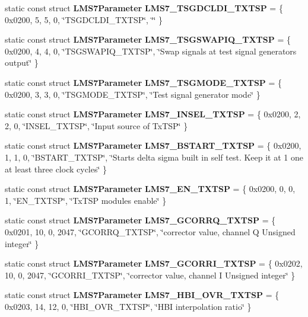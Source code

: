 \begin{DoxyCompactItemize}
\item 
static const struct {\bf L\+M\+S7\+Parameter} {\bf L\+M\+S7\+\_\+\+T\+S\+G\+D\+C\+L\+D\+I\+\_\+\+T\+X\+T\+SP} = \{ 0x0200, 5, 5, 0, \char`\"{}\+T\+S\+G\+D\+C\+L\+D\+I\+\_\+\+T\+X\+T\+S\+P\char`\"{}, \char`\"{}\char`\"{} \}
\item 
static const struct {\bf L\+M\+S7\+Parameter} {\bf L\+M\+S7\+\_\+\+T\+S\+G\+S\+W\+A\+P\+I\+Q\+\_\+\+T\+X\+T\+SP} = \{ 0x0200, 4, 4, 0, \char`\"{}\+T\+S\+G\+S\+W\+A\+P\+I\+Q\+\_\+\+T\+X\+T\+S\+P\char`\"{}, \char`\"{}\+Swap signals at test signal generator\textquotesingle{}s output\char`\"{} \}
\item 
static const struct {\bf L\+M\+S7\+Parameter} {\bf L\+M\+S7\+\_\+\+T\+S\+G\+M\+O\+D\+E\+\_\+\+T\+X\+T\+SP} = \{ 0x0200, 3, 3, 0, \char`\"{}\+T\+S\+G\+M\+O\+D\+E\+\_\+\+T\+X\+T\+S\+P\char`\"{}, \char`\"{}\+Test signal generator mode\char`\"{} \}
\item 
static const struct {\bf L\+M\+S7\+Parameter} {\bf L\+M\+S7\+\_\+\+I\+N\+S\+E\+L\+\_\+\+T\+X\+T\+SP} = \{ 0x0200, 2, 2, 0, \char`\"{}\+I\+N\+S\+E\+L\+\_\+\+T\+X\+T\+S\+P\char`\"{}, \char`\"{}\+Input source of Tx\+T\+S\+P\char`\"{} \}
\item 
static const struct {\bf L\+M\+S7\+Parameter} {\bf L\+M\+S7\+\_\+\+B\+S\+T\+A\+R\+T\+\_\+\+T\+X\+T\+SP} = \{ 0x0200, 1, 1, 0, \char`\"{}\+B\+S\+T\+A\+R\+T\+\_\+\+T\+X\+T\+S\+P\char`\"{}, \char`\"{}\+Starts delta sigma built in self test. Keep it at 1 one at least three clock cycles\char`\"{} \}
\item 
static const struct {\bf L\+M\+S7\+Parameter} {\bf L\+M\+S7\+\_\+\+E\+N\+\_\+\+T\+X\+T\+SP} = \{ 0x0200, 0, 0, 1, \char`\"{}\+E\+N\+\_\+\+T\+X\+T\+S\+P\char`\"{}, \char`\"{}\+Tx\+T\+S\+P modules enable\char`\"{} \}
\item 
static const struct {\bf L\+M\+S7\+Parameter} {\bf L\+M\+S7\+\_\+\+G\+C\+O\+R\+R\+Q\+\_\+\+T\+X\+T\+SP} = \{ 0x0201, 10, 0, 2047, \char`\"{}\+G\+C\+O\+R\+R\+Q\+\_\+\+T\+X\+T\+S\+P\char`\"{}, \char`\"{}corrector value, channel Q Unsigned integer\char`\"{} \}
\item 
static const struct {\bf L\+M\+S7\+Parameter} {\bf L\+M\+S7\+\_\+\+G\+C\+O\+R\+R\+I\+\_\+\+T\+X\+T\+SP} = \{ 0x0202, 10, 0, 2047, \char`\"{}\+G\+C\+O\+R\+R\+I\+\_\+\+T\+X\+T\+S\+P\char`\"{}, \char`\"{}corrector value, channel I Unsigned integer\char`\"{} \}
\item 
static const struct {\bf L\+M\+S7\+Parameter} {\bf L\+M\+S7\+\_\+\+H\+B\+I\+\_\+\+O\+V\+R\+\_\+\+T\+X\+T\+SP} = \{ 0x0203, 14, 12, 0, \char`\"{}\+H\+B\+I\+\_\+\+O\+V\+R\+\_\+\+T\+X\+T\+S\+P\char`\"{}, \char`\"{}\+H\+B\+I interpolation ratio\char`\"{} \}

\end{DoxyCompactItemize}

